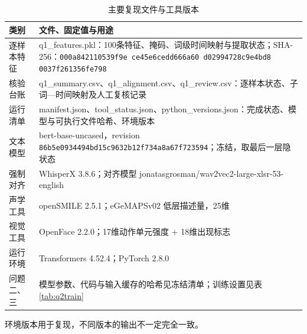 \begin{table}[htbp]
\centering
\caption{主要复现文件与工具版本}
\label{tab:appD}
\begin{tabularx}{\textwidth}{l>{\raggedright\arraybackslash}X}
\toprule
类别 & 文件、固定值与用途 \\
\midrule
逐样本特征 & q1\_features.pkl：100条特征、掩码、词级时间映射与提取状态；SHA-256：\texttt{\small 000a842110539f9e ce45e6cedd666a60 d02994728c9e4bd8 0037f261356fe798} \\
核验台账 & q1\_summary.csv、q1\_alignment.csv、q1\_review.csv：逐样本状态、子词—时间映射及人工复核记录 \\
运行清单 & manifest.json、tool\_status.json、python\_versions.json：完成状态、模型与可执行文件哈希、环境版本 \\
文本模型 & bert-base-uncased，revision \texttt{\small 86b5e0934494bd15c9632b12f734a8a67f723594}；冻结，取最后一层隐状态 \\
强制对齐 & WhisperX 3.8.6；对齐模型 jonatasgrosman/wav2vec2-large-xlsr-53-english \\
声学工具 & openSMILE 2.5.1；eGeMAPSv02 低层描述量，25维 \\
视觉工具 & OpenFace 2.2.0；17维动作单元强度 + 18维出现标志 \\
运行环境 & Transformers 4.52.4；PyTorch 2.8.0 \\
问题二、三 & 模型参数、代码与输入缓存的哈希见冻结清单；训练设置见表\ref{tab:q2train} \\
\bottomrule
\end{tabularx}
\end{table}

环境版本用于复现，不同版本的输出不一定完全一致。
